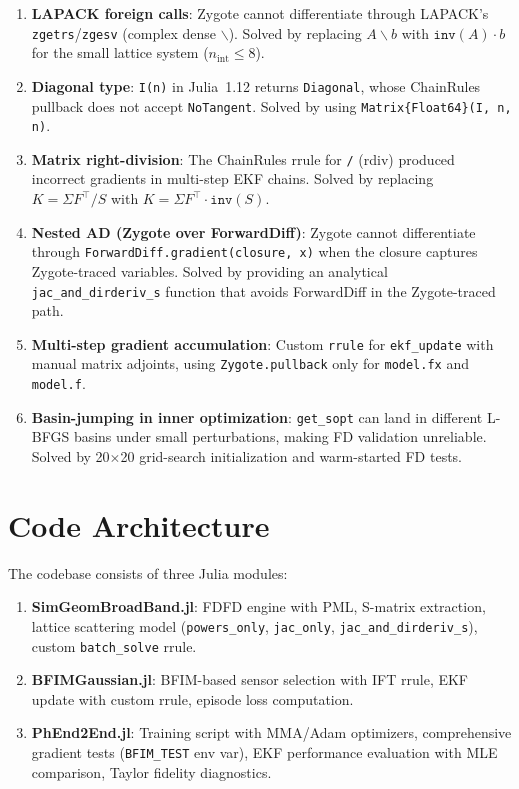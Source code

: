 \documentclass[11pt,a4paper]{article}
\begin{document}
\begin{enumerate}
  \item \textbf{LAPACK foreign calls}: Zygote cannot differentiate through LAPACK's \texttt{zgetrs}/\texttt{zgesv} (complex dense $\backslash$).  Solved by replacing $A \backslash b$ with $\texttt{inv}(A) \cdot b$ for the small lattice system ($n_{\text{int}} \leq 8$).

  \item \textbf{Diagonal type}: \texttt{I(n)} in Julia~1.12 returns \texttt{Diagonal}, whose ChainRules pullback does not accept \texttt{NoTangent}.  Solved by using \texttt{Matrix\{Float64\}(I, n, n)}.

  \item \textbf{Matrix right-division}: The ChainRules rrule for \texttt{/} (rdiv) produced incorrect gradients in multi-step EKF chains.  Solved by replacing $K = \Sigma F^\top / S$ with $K = \Sigma F^\top \cdot \texttt{inv}(S)$.

  \item \textbf{Nested AD (Zygote over ForwardDiff)}: Zygote cannot differentiate through \texttt{ForwardDiff.gradient(closure, x)} when the closure captures Zygote-traced variables.  Solved by providing an analytical \texttt{jac\_and\_dirderiv\_s} function that avoids ForwardDiff in the Zygote-traced path.

  \item \textbf{Multi-step gradient accumulation}: Custom \texttt{rrule} for \texttt{ekf\_update} with manual matrix adjoints, using \texttt{Zygote.pullback} only for \texttt{model.fx} and \texttt{model.f}.

  \item \textbf{Basin-jumping in inner optimization}: \texttt{get\_sopt} can land in different L-BFGS basins under small perturbations, making FD validation unreliable.  Solved by 20$\times$20 grid-search initialization and warm-started FD tests.
\end{enumerate}

\section{Code Architecture}

The codebase consists of three Julia modules:

\begin{enumerate}
  \item \textbf{SimGeomBroadBand.jl}: FDFD engine with PML, S-matrix extraction, lattice scattering model (\texttt{powers\_only}, \texttt{jac\_only}, \texttt{jac\_and\_dirderiv\_s}), custom \texttt{batch\_solve} rrule.

  \item \textbf{BFIMGaussian.jl}: BFIM-based sensor selection with IFT rrule, EKF update with custom rrule, episode loss computation.

  \item \textbf{PhEnd2End.jl}: Training script with MMA/Adam optimizers, comprehensive gradient tests (\texttt{BFIM\_TEST} env var), EKF performance evaluation with MLE comparison, Taylor fidelity diagnostics.
\end{enumerate}
\end{document}
